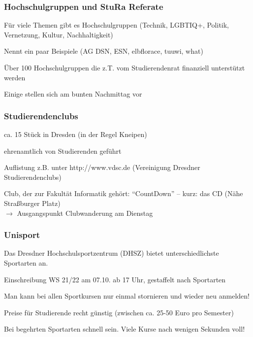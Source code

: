 \documentclass[a4paper,12pt]{scrreprt}
\begin{document}
\subsubsection{Hochschulgruppen und StuRa Referate}
\begin{itemize*}
    \item Für viele Themen gibt es Hochschulgruppen (Technik, LGBTIQ+, Politik, Vernetzung, Kultur, Nachhaltigkeit)
    \item Nennt ein paar Beispiele (AG DSN, ESN, elbflorace, tuuwi, what)
    \item Über 100 Hochschulgruppen die z.T. vom Studierendenrat finanziell unterstützt werden
    \item Einige stellen sich am bunten Nachmittag vor
\end{itemize*}

\subsubsection{Studierendenclubs}
\begin{itemize*}
    \item ca. 15 Stück in Dresden (in der Regel Kneipen)
    \item ehrenamtlich von Studierenden geführt
    \item Auflistung z.B. unter http://www.vdsc.de (Vereinigung Dresdner Studierendenclubs)
    \item Club, der zur Fakultät Informatik gehört: \enquote{CountDown} -- kurz: das CD (Nähe Straßburger Platz)\\
    $\rightarrow$ Ausgangspunkt Clubwanderung am Dienstag
\end{itemize*}

\subsubsection{Unisport}
\begin{itemize*}
    \item Das Dresdner Hochschulsportzentrum (DHSZ) bietet unterschiedlichste Sportarten an.
    \item Einschreibung WS 21/22 am 07.10. ab 17 Uhr, gestaffelt nach Sportarten
    \item Man kann  bei allen Sportkursen nur einmal stornieren und wieder neu anmelden!
    \item Preise für Studierende recht günstig (zwischen ca. 25-50 Euro pro Semester)
    \item Bei begehrten Sportarten schnell sein. Viele Kurse nach wenigen Sekunden voll!
\end{itemize*}
\end{document}
